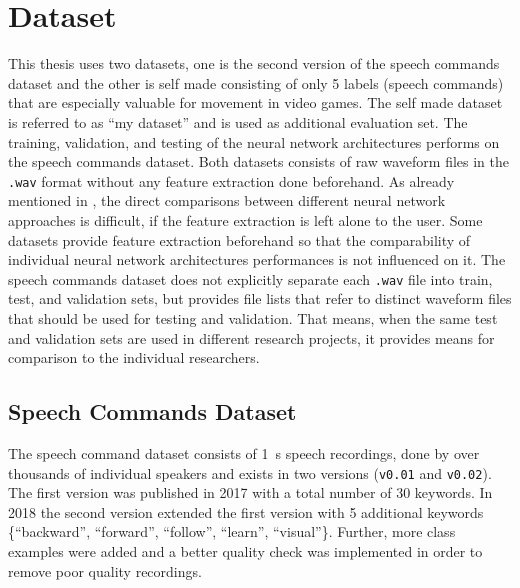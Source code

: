 
\section{Dataset}\label{sec:exp_dataset}
This thesis uses two datasets, one is the second version of the speech commands dataset \cite{Warden2018} and the other is self made consisting of only 5 labels (speech commands) that are especially valuable for movement in video games.
The self made dataset is referred to as \enquote{my dataset} and is used as additional evaluation set.
The training, validation, and testing of the neural network architectures performs on the speech commands dataset.
Both datasets consists of raw waveform files in the \texttt{.wav} format without any feature extraction done beforehand.
As already mentioned in , the direct comparisons between different neural network approaches is difficult, if the feature extraction is left alone to the user.
Some datasets provide feature extraction beforehand so that the comparability of individual neural network architectures performances is not influenced on it.
The speech commands dataset does not explicitly separate each \texttt{.wav} file into train, test, and validation sets, but provides file lists that refer to distinct waveform files that should be used for testing and validation. 
That means, when the same test and validation sets are used in different research projects, it provides means for comparison to the individual researchers.



\subsection{Speech Commands Dataset}\label{sec:exp_dataset_speech_cmd}
The speech command dataset \cite{Warden2018} consists of \SI{1}{\second} speech recordings, done by over thousands of individual speakers and exists in two versions (\texttt{v0.01} and \texttt{v0.02}).
The first version was published in 2017 with a total number of 30 keywords.
In 2018 the second version extended the first version with 5 additional keywords \{\enquote{backward}, \enquote{forward}, \enquote{follow}, \enquote{learn}, \enquote{visual}\}.
Further, more class examples were added and a better quality check was implemented in order to remove poor quality recordings.

